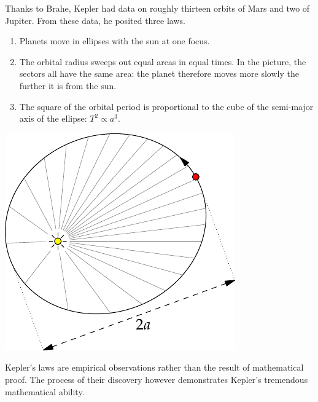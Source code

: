\begin{minipage}[t]{0.66\linewidth}\vspace{-3pt}
Thanks to Brahe, Kepler had data on roughly thirteen orbits of Mars and two of Jupiter. From these data, he posited three laws.
\begin{enumerate}\itemsep0pt
  \item Planets move in ellipses with the sun at one focus.
	\item The orbital radius sweeps out equal areas in equal times. In the picture, the sectors all have the same area: the planet therefore moves more slowly the further it is from the sun.
	\item The square of the orbital period is proportional to the cube of the semi-major axis of the ellipse: $T^2\propto a^3$.
\end{enumerate}
\end{minipage}\hfill\begin{minipage}[t]{0.32\linewidth}\vspace{-10pt}
\flushright\includegraphics[scale=0.85]{ren-kepler}
\end{minipage}
\goodbreak


Kepler's laws are empirical observations rather than the result of mathematical proof. The process of their discovery however demonstrates Kepler's tremendous mathematical ability.

